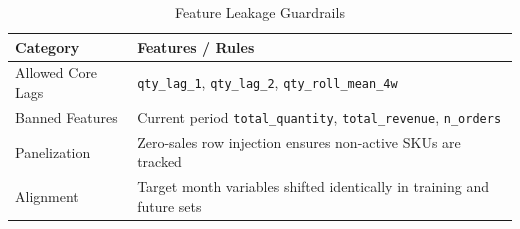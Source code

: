 \begin{table}[hbt!]
\centering
\caption{Feature Leakage Guardrails}
\label{tab:feature_guardrails}
\begin{tabular}{@{} l p{10cm} @{}}
\toprule
\textbf{Category} & \textbf{Features / Rules} \\
\midrule
Allowed Core Lags & \texttt{qty\_lag\_1}, \texttt{qty\_lag\_2}, \texttt{qty\_roll\_mean\_4w} \\
Banned Features & Current period \texttt{total\_quantity}, \texttt{total\_revenue}, \texttt{n\_orders} \\
Panelization & Zero-sales row injection ensures non-active SKUs are tracked \\
Alignment & Target month variables shifted identically in training and future sets \\
\bottomrule
\end{tabular}
\end{table}
